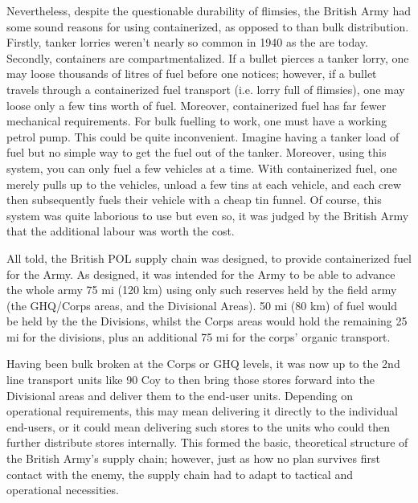 \documentclass[noraggedright]{turabian-researchpaper}
\newcommand{\SupInWar}{Precis on Lecture ``Supplies in War'', (Part II)}
\begin{document}
Nevertheless, despite the questionable durability of flimsies, the British 
Army had some sound reasons for using containerized, as opposed to than bulk 
distribution.  Firstly, tanker lorries weren't nearly so common in 1940 as the 
are today.  Secondly,
containers are compartmentalized.  If a bullet pierces a tanker lorry, one may
loose thousands of litres of fuel before one notices; however, if a bullet 
travels through a containerized fuel transport (i.e. lorry full of flimsies),
one may loose only a few tins worth of fuel.  Moreover, containerized fuel has
far fewer mechanical requirements.  For bulk fuelling to work, one must have a 
working petrol pump.  This could be quite inconvenient.  Imagine having a 
tanker load of fuel but no simple way to get the fuel out of the tanker.  
Moreover, using this system, you can only fuel a few vehicles at a time.  
With containerized fuel, one merely pulls up to the vehicles, unload a few
tins at each vehicle, and each crew then subsequently fuels their vehicle
with a cheap tin funnel.  Of course, this system was quite laborious to 
use but even so, it was judged by the British Army that the additional labour
was worth the cost.  %

All told, the British POL supply chain was designed, to provide containerized
fuel for the Army.  As designed, it was intended for the Army to be able to
advance the whole army 75 mi (120 km) using only such reserves held by the 
field army (the GHQ/Corps areas, and the Divisional Areas).  50 mi (80 km) 
of fuel would be held by the the Divisions, whilst the Corps areas would hold
the remaining 25 mi for the divisions, plus an additional 75 mi for the corps'
organic transport.\autocite[\SupInWar][3]{27course}

Having been bulk broken at the Corps or GHQ levels, it was now up to the 2nd
line transport units like 90 Coy to then bring those stores forward into the
Divisional areas and deliver them to the end-user units.  Depending on 
operational requirements, this may mean delivering it directly to the 
individual end-users, or it could mean delivering such stores to the units who 
could then further distribute stores internally.  This formed the basic, 
theoretical structure of the British Army's supply chain; however, just as how
no plan survives first contact with the enemy, the supply chain had to adapt
to tactical and operational necessities.  
\end{document}

